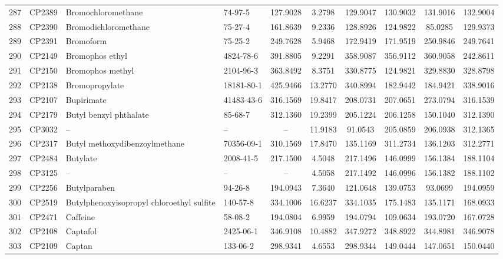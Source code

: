 \begin{longtable}{clllcccccc}
287 & CP2389 & Bromochloromethane & 74-97-5 & 127.9028 & 3.2798 & 129.9047 & 130.9032 & 131.9016 & 132.9004 \\ 
288 & CP2390 & Bromodichloromethane\smash{\textsuperscript{\textdaggerdbl}} & 75-27-4 & 161.8639 & 9.2336 & 128.8926 & 124.9822 & 85.0285 & 129.9373 \\ 
289 & CP2391 & Bromoform\smash{\textsuperscript{\textdagger}} & 75-25-2 & 249.7628 & 5.9468 & 172.9419 & 171.9519 & 250.9846 & 249.7641 \\ 
290 & CP2149 & Bromophos ethyl & 4824-78-6 & 391.8805 & 9.2291 & 358.9087 & 356.9112 & 360.9058 & 242.8611 \\ 
291 & CP2150 & Bromophos methyl & 2104-96-3 & 363.8492 & 8.3751 & 330.8775 & 124.9821 & 329.8830 & 328.8798 \\ 
292 & CP2138 & Bromopropylate & 18181-80-1 & 425.9466 & 13.2770 & 340.8994 & 182.9442 & 184.9421 & 338.9016 \\ 
293 & CP2107 & Bupirimate\smash{\textsuperscript{\textdaggerdbl}} & 41483-43-6 & 316.1569 & 19.8417 & 208.0731 & 207.0651 & 273.0794 & 316.1539 \\ 
294 & CP2179 & Butyl benzyl phthalate & 85-68-7 & 312.1360 & 19.2399 & 205.1224 & 206.1258 & 150.1040 & 312.1390 \\ 
295 & CP3032 & – & – & – & 11.9183 & 91.0543 & 205.0859 & 206.0938 & 312.1365 \\ 
296 & CP2317 & Butyl methoxydibenzoylmethane & 70356-09-1 & 310.1569 & 17.8470 & 135.1169 & 311.2734 & 136.1203 & 312.2771 \\ 
297 & CP2484 & Butylate & 2008-41-5 & 217.1500 & 4.5048 & 217.1496 & 146.0999 & 156.1384 & 188.1104 \\ 
298 & CP3125 & – & – & – & 4.5058 & 217.1492 & 146.0996 & 156.1382 & 188.1102 \\ 
299 & CP2256 & Butylparaben & 94-26-8 & 194.0943 & 7.3640 & 121.0648 & 139.0753 & 93.0699 & 194.0959 \\ 
300 & CP2519 & Butylphenoxyisopropyl chloroethyl sulfite & 140-57-8 & 334.1006 & 16.6237 & 334.1035 & 175.1483 & 135.1171 & 168.0933 \\ 
301 & CP2471 & Caffeine & 58-08-2 & 194.0804 & 6.9959 & 194.0794 & 109.0634 & 193.0720 & 167.0728 \\ 
302 & CP2108 & Captafol & 2425-06-1 & 346.9108 & 10.4882 & 347.9272 & 348.8922 & 344.8981 & 346.9078 \\ 
303 & CP2109 & Captan & 133-06-2 & 298.9341 & 4.6553 & 298.9344 & 149.0444 & 147.0651 & 150.0440 \\ 

\end{longtable}
